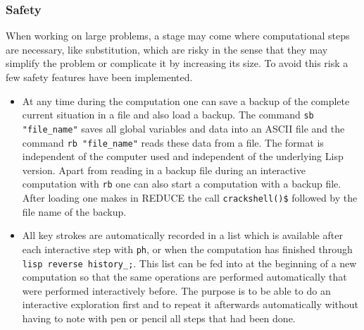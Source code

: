 \subsubsection{Safety}

When working on large problems, a stage may come where computational
steps are necessary, like substitution, which are risky in the sense
that they may simplify the problem or complicate it by increasing its
size.  To avoid this risk a few safety features have been implemented.
\begin{itemize}
\item At any time during the computation one can save a backup of the
  complete current situation in a file and also load a backup.  The
  command \texttt{sb "file\_name"} saves all global variables and data
  into an ASCII file and the command \texttt{rb "file\_name"} reads
  these data from a file.  The format is independent of the computer
  used and independent of the underlying Lisp version.  Apart from
  reading in a backup file during an interactive computation with
  \texttt{rb} one can also start a computation with a backup file.
  After loading  one makes in REDUCE the call
  \texttt{crackshell()\$} followed by the file name of the backup.
\item All key strokes are automatically recorded in a list which is
  available after each interactive step with \texttt{ph}, or when the
  computation has finished through \texttt{lisp reverse history\_;}.
  This list can be fed into  at the beginning of a new
  computation so that the same operations are performed automatically
  that were performed interactively before.  The purpose is to be able
  to do an interactive exploration first and to repeat it afterwards
  automatically without having to note with pen or pencil all steps
  that had been done.


\end{itemize}
